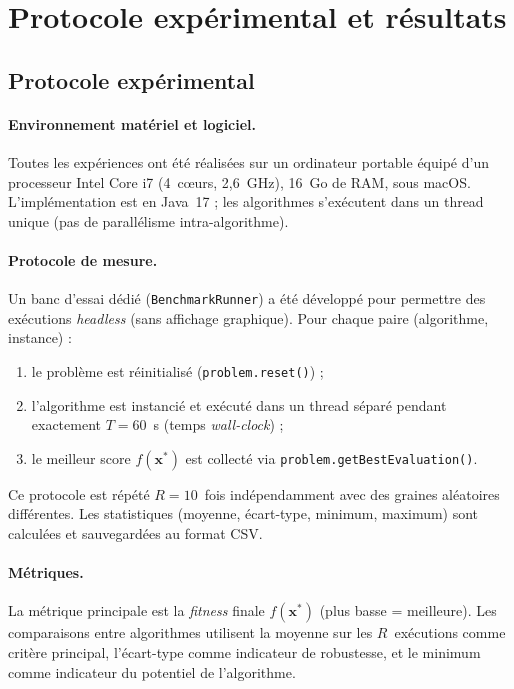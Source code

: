 \section{Protocole expérimental et résultats}
\label{sec:experiments}

\subsection{Protocole expérimental}

\paragraph{Environnement matériel et logiciel.}
Toutes les expériences ont été réalisées sur un ordinateur portable équipé d'un
processeur Intel Core i7 (4~cœurs, 2,6~GHz), 16~Go de RAM, sous macOS.
L'implémentation est en Java~17 ; les algorithmes s'exécutent dans un thread
unique (pas de parallélisme intra-algorithme).

\paragraph{Protocole de mesure.}
Un banc d'essai dédié (\texttt{BenchmarkRunner}) a été développé pour
permettre des exécutions \textit{headless} (sans affichage graphique).  Pour
chaque paire (algorithme, instance) :
\begin{enumerate}[nosep]
  \item le problème est réinitialisé (\texttt{problem.reset()}) ;
  \item l'algorithme est instancié et exécuté dans un thread séparé pendant
        exactement $T = 60$~s (temps \textit{wall-clock}) ;
  \item le meilleur score $f(\mathbf{x}^*)$ est collecté via
        \texttt{problem.getBestEvaluation()}.
\end{enumerate}
Ce protocole est répété $R = 10$~fois indépendamment avec des graines
aléatoires différentes.  Les statistiques (moyenne, écart-type, minimum,
maximum) sont calculées et sauvegardées au format CSV.

\paragraph{Métriques.}
La métrique principale est la \textit{fitness} finale $f(\mathbf{x}^*)$
(plus basse = meilleure).  Les comparaisons entre algorithmes utilisent la
moyenne sur les $R$~exécutions comme critère principal, l'écart-type comme
indicateur de robustesse, et le minimum comme indicateur du potentiel de
l'algorithme.

